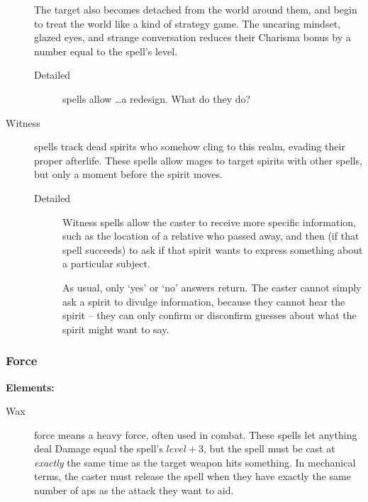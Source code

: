 \begin{multicols}{2}
\begin{description}
    The target also becomes detached from the world around them, and begin to treat the world like a kind of strategy game.
    The uncaring mindset, glazed eyes, and strange conversation reduces their Charisma bonus by a number equal to the spell's level.
    \begin{description}
      \item[Detailed]
        spells allow \ldots a redesign. What do they do?
    \end{description}
  \item[Witness]
    spells track dead spirits who somehow cling to this realm, evading their proper afterlife.%
    These spells allow mages to target spirits with other spells, but only a moment before the spirit moves.
    \begin{description}
      \item[Detailed]
        Witness spells allow the caster to receive more specific information, such as the location of a relative who passed away, and then (if that spell succeeds) to ask if that spirit wants to express something about a particular subject.

        As usual, only `yes' or `no' answers return.
        The caster cannot simply ask a spirit to divulge information, because they cannot hear the spirit -- they can only confirm or disconfirm guesses about what the spirit might want to say.
    \end{description}
\end{description}

\subsubsection{Force}

\textbf{Elements:}

\begin{description}
  \item[Wax]
  force means a heavy force, often used in combat.
  These spells let anything deal Damage equal the spell's $level + 3$, but the spell must be cast at \emph{exactly} the same time as the target weapon hits something.
  In mechanical terms, the caster must release the spell when they have exactly the same number of \glspl{ap} as the attack they want to aid.


\end{description}
\end{multicols}
